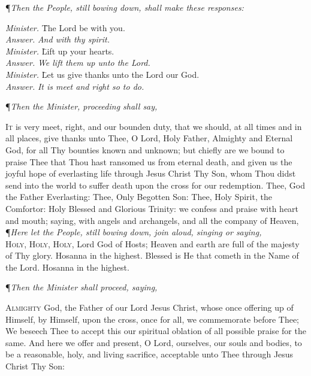 {\centering \P \textit{Then the People, still bowing down, shall make these responses:} \par}
\vspace{-2ex}
\begin{tabbing}
	\textit{Minister.} \= The Lord be with you. \\
	\textit{Answer.} \> \textit{And with thy spirit.} \\
	\textit{Minister.} \= Lift up your hearts. \\
	\textit{Answer.} \> \textit{We lift them up unto the Lord.} \\
	\textit{Minister.} \= Let us give thanks unto the Lord our God. \\
	\textit{Answer.} \> \textit{It is meet and right so to do.} \\
\end{tabbing}

{\centering \P\textit{Then the Minister, proceeding shall say,}\par} 
\vspace{1ex}

\lettrine{I}{t} is very meet, right, and our bounden duty, that we should, at all times and in all places, give thanks unto Thee, O Lord, Holy Father, Almighty and Eternal God, for all Thy bounties known and unknown; but chiefly are we bound to praise Thee that Thou hast ransomed us from eternal death, and given us the joyful hope of everlasting life through Jesus Christ Thy Son, whom Thou didst send into the world to suffer death upon the cross for our redemption.
Thee, God the Father Everlasting: Thee, Only Begotten Son: Thee, Holy Spirit, the Comfortor: Holy Blessed and Glorious Trinity: we confess and praise with heart and mouth; saying, with angels and archangels, and all the company of Heaven, \\

\noindent\P\textit{Here let the People, still bowing down, join aloud, singing or saying,} \\ 

\lettrine{H}{oly, Holy, Holy,} Lord God of Hosts; Heaven and earth are full of the majesty of Thy glory.
Hosanna in the highest.
Blessed is He that cometh in the Name of the Lord.
Hosanna in the highest. \\

{\centering \P\textit{Then the Minister shall proceed, saying,}\par} 
\vspace{1ex}

\lettrine{A}{lmighty} God, the Father of our Lord Jesus Christ, whose once offering up of Himself, by Himself, upon the cross, once for all, we commemorate before Thee;
We beseech Thee to accept this our spiritual oblation of all possible praise for the same.
And here we offer and present, O Lord, ourselves, our souls and bodies, to be a reasonable, holy, and living sacrifice, acceptable unto Thee through Jesus Christ Thy Son:


